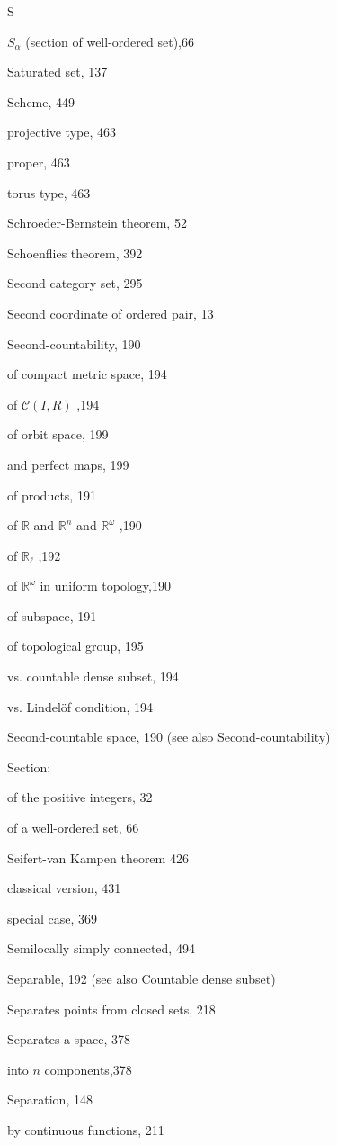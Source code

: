S

\({S}_{\alpha }\) (section of well-ordered set),66

Saturated set, 137

Scheme, 449

projective type, 463

proper, 463

torus type, 463

Schroeder-Bernstein theorem, 52

Schoenflies theorem, 392

Second category set, 295

Second coordinate of ordered pair, 13

Second-countability, 190

of compact metric space, 194

of \(\mathcal{C}\left( {I,R}\right)\) ,194

of orbit space, 199

and perfect maps, 199

of products, 191

of \(\mathbb{R}\) and \({\mathbb{R}}^{n}\) and \({\mathbb{R}}^{\omega }\) ,190

of \({\mathbb{R}}_{\ell }\) ,192

of \({\mathbb{R}}^{\omega }\) in uniform topology,190

of subspace, 191

of topological group, 195

vs. countable dense subset, 194

vs. Lindelöf condition, 194

Second-countable space, 190 (see also Second-countability)

Section:

of the positive integers, 32

of a well-ordered set, 66

Seifert-van Kampen theorem 426

classical version, 431

special case, 369

Semilocally simply connected, 494

Separable, 192 (see also Countable dense subset)

Separates points from closed sets, 218

Separates a space, 378

into \(n\) components,378

Separation, 148

by continuous functions, 211

